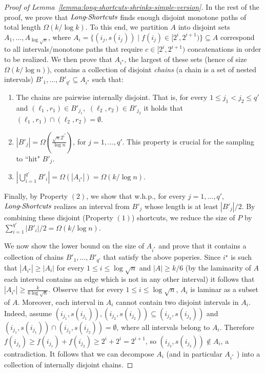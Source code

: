 \documentclass[11pt]{article}
\newcommand{\LS}{\mbox{{\it Long}-{\it Shortcuts}}}
\begin{document}
\begin{proof}[Proof of Lemma~\ref{lemma:long-shortcuts-shrinks-simple-version}]
In the rest of the proof, we prove that $\LS$ finds enough disjoint monotone paths of total length $\Omega(k/\log k)$. To this end, we partition $A$ into disjoint sets $A_1,\ldots, A_{\log \sqrt{n}}$, where $A_i = \{(i_j,s(i_j)) \mid f(i_j) \in  [2^i, 2^{i+1}) \}\subseteq A $ correspond to all intervals/monotone paths that require $c\in [2^i, 2^{i+1})$ concatenations in order to be realized. We then prove that $A_{i^\star}$, the largest of these sets (hence of size $\Omega(k/\log n)$),  contains a collection of disjoint \emph{chains} (a chain is a set of nested intervals) $B'_1,\ldots,B'_{q'}\subseteq A_{i^\star}$ such that:
\begin{enumerate}
    \item The chains are pairwise internally disjoint.
    That is, for every $1\le j_1<j_2\le q'$ and $(\ell_1,r_1)\in B'_{j_1},$ $(\ell_2,r_2)\in B'_{j_2}$ it holds that $(\ell_1,r_1)\cap (\ell_2,r_2) = \emptyset$.
    \item $|B'_j| = \Omega\left( \frac{\sqrt{n} 2^{i^\star}}{\log n} \right)$, for $j=1,\ldots,q'$. This property is crucial for the sampling to ``hit" $B'_j$.
    \item $|\bigcup_{i=1}^{q'}  B'_i| = \Omega(|A_{i^\star}|)=\Omega(k/\log n)$.
\end{enumerate}
Finally, by Property $(2)$, we show that w.h.p., for every $j=1,\ldots,q'$, $\LS$ realizes an interval from $B'_j$ whose length is at least $|B'_j|/2$. By combining these disjoint (Property $(1)$) shortcuts, we reduce the size of $P$ by $\sum_{i=1}^{q'}  |B'_i|/2 = \Omega(k/\log n)$.

    We now show the lower bound on the size of $A_{i^*}$ and prove that it contains a collection of chains $B'_1,\ldots, B'_{q'}$ that satisfy the above poperies.
Since $i^\star$ is such that $|A_{i^\star}| \ge |A_i|$ for every $1\le i \le \log \sqrt{n}$ and $|A| \ge k/6$ (by the laminarity of $A$ each interval contains an edge which is not in any other interval) it follows that $|A_{i^\star}|\ge \frac{k}{6 \log{\sqrt{n}}}$. 
    Observe that for every $1\le i \le \log \sqrt{n}$, $A_{i}$ is laminar as a subset of $A$. Moreover, each interval in $A_{i}$ cannot contain two disjoint intervals in $A_i$. Indeed,  assume $(i_{j_1},s(i_{j_1})), (i_{j_2},s(i_{j_2})) \subseteq (i_{j_3},s(i_{j_3}))$ and $(i_{j_1},s(i_{j_1})) \cap (i_{j_2},s(i_{j_2})) = \emptyset$, where all intervals belong to $A_{i}$. Therefore $f(i_{j_3}) \ge f(i_{j_1}) + f(i_{j_2}) \ge 2^{i} + 2^{i} = 2^{i+1}$, so $(i_{j_3},s(i_{j_3})) \notin A_{i}$, a contradiction. It follows that we can decompose $A_i$ (and in particular $A_{i^*}$ ) into a collection of internally disjoint chains. 


\end{proof}
\end{document}
